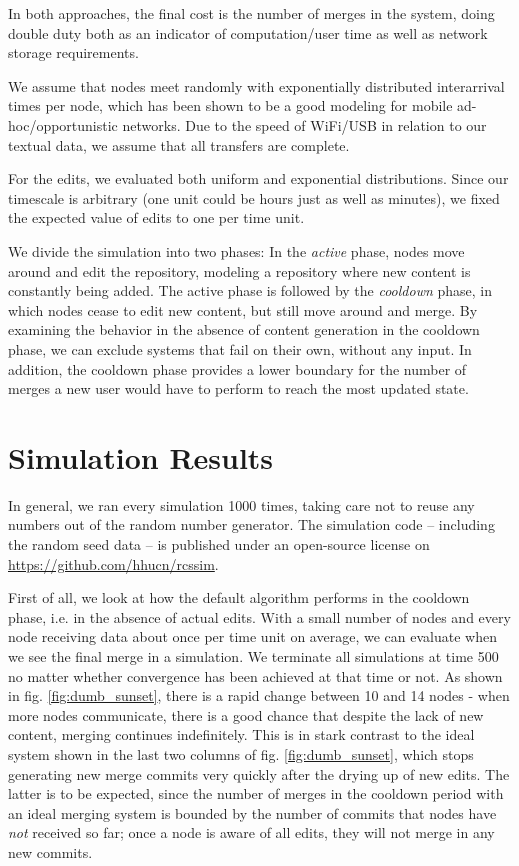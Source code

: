 \documentclass[conference,letterpaper]{IEEEtran}
\begin{document}
In both approaches, the final cost is the number of merges in the system, doing double duty both as an indicator of computation/user time as well as network storage requirements.

We assume that nodes meet randomly with exponentially distributed interarrival times per node, which has been shown to be a good modeling for mobile ad-hoc/opportunistic networks\cite{groenevelt}. Due to the speed of WiFi/USB in relation to our textual data, we assume that all transfers are complete.

For the edits, we evaluated both uniform and exponential distributions. Since our timescale is arbitrary (one unit could be hours just as well as minutes), we fixed the expected value of edits to one per time unit.

We divide the simulation into two phases: In the \textit{active} phase, nodes move around and edit the repository, modeling a repository where new content is constantly being added. The active phase is followed by the \textit{cooldown} phase, in which nodes cease to edit new content, but still move around and merge. By examining the behavior in the absence of content generation in the cooldown phase, we can exclude systems that fail on their own, without any input. In addition, the cooldown phase provides a lower boundary for the number of merges a new user would have to perform to reach the most updated state.

\section{Simulation Results}

In general, we ran every simulation 1000 times, taking care not to reuse any numbers out of the random number generator. The simulation code -- including the random seed data -- is published under an open-source license on \url{https://github.com/hhucn/rcssim}.

First of all, we look at how the default algorithm performs in the cooldown phase, i.e. in the absence of actual edits. With a small number of nodes and every node receiving data about once per time unit on average, we can evaluate when we see the final merge in a simulation. We terminate all simulations at time 500 no matter whether convergence has been achieved at that time or not. As shown in fig. \ref{fig:dumb_sunset}, there is a rapid change between 10 and 14 nodes - when more nodes communicate, there is a good chance that despite the lack of new content, merging continues indefinitely. This is in stark contrast to the ideal system shown in the last two columns of fig. \ref{fig:dumb_sunset}, which stops generating new merge commits very quickly after the drying up of new edits. The latter is to be expected, since the number of merges in the cooldown period with an ideal merging system is bounded by the number of commits that nodes have \textit{not} received so far; once a node is aware of all edits, they will not merge in any new commits.
\end{document}
